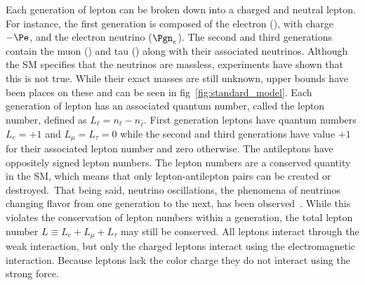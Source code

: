 Each generation of lepton can be broken down into a charged and neutral lepton.
For instance, the first generation is composed of the electron (\Pe), with charge $-\Pe$, and the electron neutrino ($\Pgn_{e}$).
The second and third generations contain the muon (\Pmu) and tau (\Ptau) along with their associated neutrinos.
Although the SM specifies that the neutrinos are massless, experiments have shown that this is not true.
While their exact masses are still unknown, upper bounds have been places on these and can be seen in fig~\ref{fig:standard_model}.
Each generation of lepton has an associated quantum number, called the lepton number, defined as $L_{\ell}=n_{\ell}-n_{\bar{\ell}}$.
First generation leptons have quantum numbers $L_{e}=+1$ and $L_{\mu}=L_{\tau}=0$ while the second and third generations have value $+1$ for their associated lepton number and zero otherwise.
The antileptons have oppositely signed lepton numbers.
The lepton numbers are a conserved quantity in the SM, which means that only lepton-antilepton pairs can be created or destroyed.\
That being said, neutrino oscillations, the phenomena of neutrinos changing flavor from one generation to the next, has been observed~\cite{Maltoni:2004ei}.
While this violates the conservation of lepton numbers within a generation, the total lepton number $L{\equiv}L_{e}+L_{\mu}+L_{\tau}$ may still be conserved.
All leptons interact through the weak interaction, but only the charged leptons interact using the electromagnetic interaction.
Because leptons lack the color charge they do not interact using the strong force.

